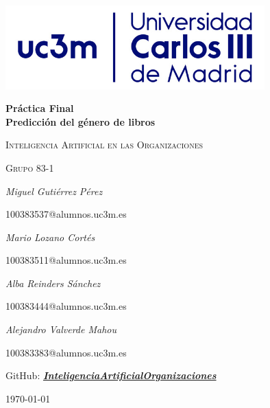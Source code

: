 \documentclass[12pt,a4paper, xcolor=table]{article}
\begin{document}
\setlength{\parindent}{0pt}
\begin{titlepage}
        \centering
        \includegraphics[width=0.75\textwidth]{img/logo_uc3m.jpg}\par\vspace{2cm}
        {\huge\bfseries Práctica Final \\ Predicción del género de libros\par}
        \vspace{0.5cm}
        {\scshape\Large Inteligencia Artificial en las Organizaciones\par}
        \vspace{1.5cm}
        {\scshape\Large Grupo 83-1\par}
        \vspace{1.5cm}
        {\Large\itshape Miguel Gutiérrez Pérez\par}
        {\Large 100383537@alumnos.uc3m.es \par}
        \vspace{1cm}
        {\Large\itshape Mario Lozano Cortés\par}
        {\Large 100383511@alumnos.uc3m.es\par}
        \vspace{1cm}
        {\Large\itshape Alba Reinders Sánchez\par}
        {\Large 100383444@alumnos.uc3m.es\par}
        \vspace{1cm}
        {\Large\itshape Alejandro Valverde Mahou\par}
        {\Large 100383383@alumnos.uc3m.es\par}
        \vspace{5mm}
        {\large GitHub: \textbf{\textit{\href{https://github.com/Pheithar/InteligenciaArtificialOrganizaciones}{InteligenciaArtificialOrganizaciones}}}}
        \vfill

        {\large \today\par}
\end{titlepage}

\tableofcontents

\newpage
\end{document}
